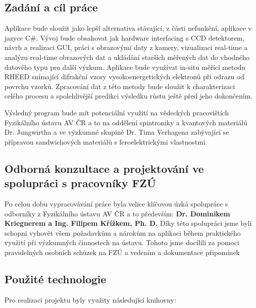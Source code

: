 \documentclass{article}
\begin{document}
\subsection{Zadání a cíl práce}
    Aplikace bude sloužit jako lepší alternativa stávající, z části nefunkční, aplikace v jazyce C\#. Vývoj bude obsahovat jak hardware interfacing s CCD detektorem, návrh a realizaci GUI, práci s obrazovými daty z kamery, vizualizaci real-time a analýzu real-time obrazových dat a ukládání starších měřených dat do vhodného datového typu pro další výzkum. Aplikace bude využívat in-situ měřící metodu RHEED snímající difrakční vzory vysokoenergetických elektronů při odrazu od povrchu vzorků. Zpracování dat z této metody bude sloužit k charakterizaci celého procesu a spolehlivější predikci výsledku růstu ještě před jeho dokončením. 
    
    Výsledný program bude mít potenciální využití na vědeckých pracovištích Fyzikálního ústavu AV ČR a to na oddělení spintroniky a kvantových materiálů Dr. Jungwirtha a ve výzkumné skupině Dr. Tima Verhagena zabývající se přípravou sandwichových materiálů s feroelektrickými vlastnostmi.
    
\subsection{Odborná konzultace a projektování ve spolupráci s pracovníky FZÚ}
	Po celou dobu vypracovávání práce byla velice klíčovou úzká spolupráce s odborníky z Fyzikálního ústavu AV ČR a to především: \textbf{Dr. Dominikem Kriegnerem a Ing. Filipem Křížkem, Ph. D.} Díky této spolupráci jsme byli schopni vyhovět všem požadavkům a nárokům na aplikaci během praktického využití při výzkumných činnostech na ústavu. Tohoto jsme docílili za pomoci pravidelných osobních schůzek na FZÚ a vedením a dokumentace připomínek
	
	
\newpage
\subsection{Použité technologie}

Pro realizaci projektu byly využity následující knihovny:
\end{document}
